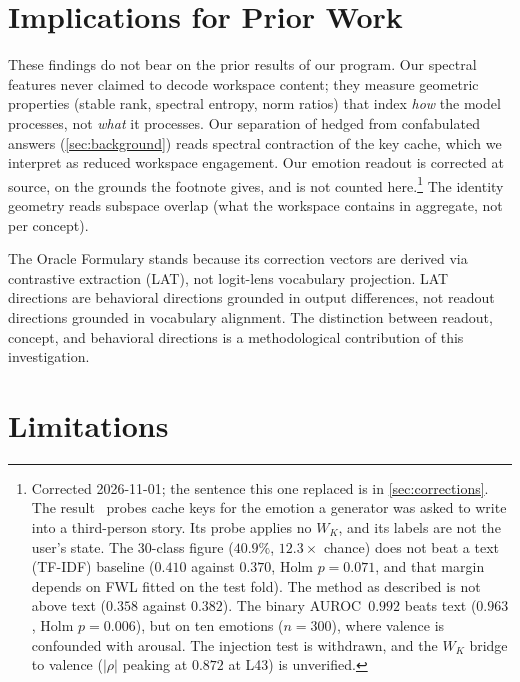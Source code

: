 \documentclass[11pt,a4paper]{article}
\begin{document}
\section{Implications for Prior Work}
\label{sec:implications}

These findings do not bear on the prior results of our program. Our
spectral features never claimed to decode workspace content; they
measure geometric properties (stable rank, spectral entropy, norm
ratios) that index \emph{how} the model processes, not \emph{what} it
processes. Our separation of hedged from confabulated answers
(\cref{sec:background}) reads spectral contraction of the key cache,
which we interpret as reduced workspace engagement. Our emotion readout is corrected
at source, on the grounds the footnote gives, and is not counted
here.\footnote{Corrected 2026-11-01; the sentence this one replaced is
in \cref{sec:corrections}. The result~\citep{lyra2026usermodel} probes
cache keys for the emotion a generator was asked to write into a
third-person story. Its probe applies no
$W_K$, and its labels are not the user's state. The 30-class figure
($40.9\%$, $12.3\times$ chance) does not beat a text (TF-IDF) baseline
($0.410$ against $0.370$, Holm $p = 0.071$, and that margin depends on FWL
fitted on the test fold). The method as described is not above text
($0.358$ against $0.382$). The binary AUROC~$0.992$ beats text ($0.963$,
Holm $p = 0.006$), but on ten emotions ($n = 300$), where valence is
confounded with arousal. The injection test is withdrawn, and the $W_K$
bridge to valence ($|\rho|$ peaking at $0.872$ at L43) is unverified.} The
identity geometry reads
subspace overlap (what the workspace contains in aggregate, not per
concept).

The Oracle Formulary stands because its correction vectors are derived
via contrastive extraction (LAT), not logit-lens vocabulary projection.
LAT directions are behavioral directions grounded in output differences,
not readout directions grounded in vocabulary alignment. The
distinction between readout, concept, and behavioral directions is a
methodological contribution of this investigation.

\section{Limitations}
\label{sec:limitations}
\end{document}
